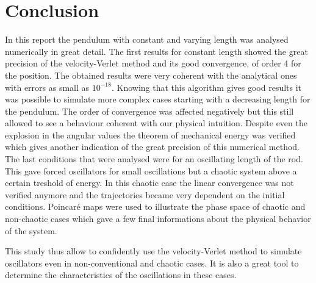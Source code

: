 \section{Conclusion}
In this report the pendulum with constant and varying length was analysed numerically in great detail. The first results for constant length showed the great precision of the velocity-Verlet method and its good convergence, of order 4 for the position. The obtained results were very coherent with the analytical ones with errors as small as $10^{-18}$. Knowing that this algorithm gives good results it was possible to simulate more complex cases starting with a decreasing length for the pendulum. The order of convergence was affected negatively but this still allowed to see a behaviour coherent with our physical intuition. Despite even the explosion in the angular values the theorem of mechanical energy was verified which gives another indication of the great precision of this numerical method. The last conditions that were analysed were for an oscillating length of the rod. This gave forced oscillators for small oscillations but a chaotic system above a certain treshold of energy. In this chaotic case the linear convergence was not verified anymore and the trajectories became very dependent on the initial conditions. Poincaré maps were used to illustrate the phase space of chaotic and non-chaotic cases which gave a few final informations about the physical behavior of the system.

This study thus allow to confidently use the velocity-Verlet method to simulate oscillators even in non-conventional and chaotic cases. It is also a great tool to determine the characteristics of the oscillations in these cases.